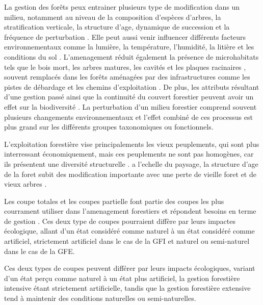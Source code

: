 La gestion des forêts peux entrainer plusieurs type de modification dans un milieu, notamment au niveau de la composition d'espèces d'arbres, la stratification verticale, la structure d'age, dynamique de succession et la fréquence de perturbation \citep{Commarmot2005Structurevirgin}. 
Elle peut aussi venir influencer différents facteurs environnementaux comme la lumière, la température, l'humidité, la litière et les conditions du sol \citep{Sebastia2005Plantdiversity,Michal2014Responsessmall,James2016effectharvest,Zhang2022Intensiveforest}. 
L'amenagement réduit également la présence de microhabitats tels que le bois mort, les arbres matures, les cavités et les plaques racinaires \citep{Berg1994ThreatenedPlant,Spies1999Dynamicforest,Bouget2005Shorttermeffect,Christensen2005Deadwood,Brassard2008EffectsForest}, souvent remplacés dans les forêts aménagées par des infrastructures comme les pistes de débardage et les chemins d'exploitation \citep{Hansen1991ConservingBiodiversity,}. 
De plus, les attributs résultant d'une gestion passé ainsi que la continuité du couvert forestier peuvent avoir un effet sur la biodiversité \citep{Hjalten2007importancesubstrate}. 
La perturbation d'un milieu forestier comprend souvent plusieurs changements environnementaux et l'effet combiné de ces processus est plus grand sur les différents groupes taxonomiques ou fonctionnels. 


L'exploitation forestière vise principalements les vieux peuplements, qui sont plus interressant économiquement, mais ces peuplements ne sont pas homogènes, car ils présentent une diversité structurelle \citep{Martin2018Structuraldiversity}.
a l'echelle du paysage, la structure d'age de la foret subit des modification importante avec une perte de vieille foret et de vieux arbres \citep{Linder1998Structuralchanges,Lilja2005Structureold}. 

Les coupe totales et les coupes partielle font partie des coupes les plus courrament utiliser dans l'amenagement forestiers et répondent besoins en terme de gestion \citep{Man2008Elevenyearresponses,Chaudhary2016Impactforest,MontoroGirona2018ConiferRegeneration,Ameray2021Forestcarbon}.
Ces deux type de coupes pourraient diffère par leurs impactes écologique, allant d'un état considéré comme naturel à un état considéré comme artificiel, strictement artificiel dans le cas de la GFI et naturel ou semi-naturel dans le cas de la GFE.

Ces deux types de coupes peuvent différer par leurs impacts écologiques, variant d'un état perçu comme naturel à un état plus artificiel, la gestion forestière intensive étant strictement artificielle, tandis que la gestion forestière extensive tend à maintenir des conditions naturelles ou semi-naturelles.

